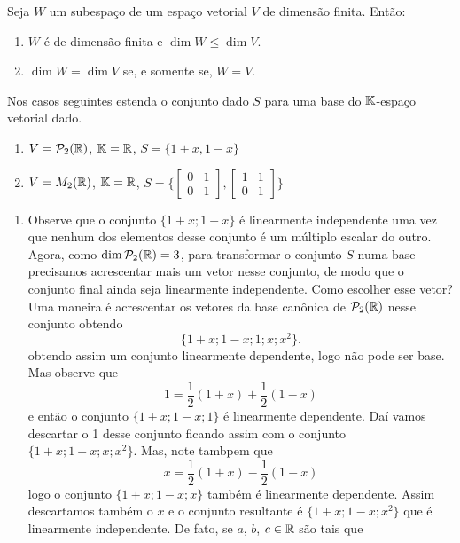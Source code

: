 \begin{exemplos}
\begin{teorema}
  Seja $W$ um subespaço de um espaço vetorial $V$ de dimensão finita. Então: 
  \begin{enumerate}[label={\roman*})]
    \item $W$ é de dimensão finita e $\dim W \le \dim V$. 
        
    \item $\dim W = \dim V$ se, e somente se, $W = V$.
  \end{enumerate}
\end{teorema}

\begin{exemplos}
  Nos casos seguintes estenda o conjunto dado $S$ para uma base do $\mathbb{K}$-espaço vetorial dado.
  \begin{enumerate}
    \item $V = \mathcal{P}_2(\mathbb{R})$, $\mathbb{K} = \mathbb{R}$, $S = \{1 + x, 1 - x\}$
    \item $V = M_2(\mathbb{R})$, $\mathbb{K} = \mathbb{R}$, $S = \{\begin{bmatrix}0 & 1\\0 & 1\end{bmatrix}, \begin{bmatrix}1 & 1\\0 & 1\end{bmatrix}\}$
  \end{enumerate}
  \begin{solucao}
    \begin{enumerate}
      \item Observe que o conjunto $\{1 + x; 1 - x\}$ é linearmente independente uma vez que nenhum dos elementos desse conjunto é um múltiplo escalar do outro. Agora, como $\dim\mathcal{P}_2(\mathbb{R}) = 3$, para transformar o conjunto $S$ numa base precisamos acrescentar mais um vetor nesse conjunto, de modo que o conjunto final ainda seja linearmente independente. Como escolher esse vetor?
        Uma maneira é acrescentar os vetores da base canônica de $\mathcal{P}_2(\mathbb{R})$ nesse conjunto obtendo
        \[
          \{1 + x; 1 - x; 1; x; x^2\}.
        \]
        obtendo assim um conjunto linearmente dependente, logo não pode ser base. Mas observe que
        \[
          1 = \dfrac{1}{2}(1 + x) + \dfrac{1}{2}(1 - x)
        \]
        e então o conjunto $\{1 + x; 1 - x; 1\}$ é linearmente dependente. Daí vamos descartar o 1 desse conjunto ficando assim com o conjunto $\{1 + x; 1 - x; x; x^2\}$. Mas, note tambpem que
        \[
          x = \dfrac{1}{2}(1 + x) - \dfrac{1}{2}(1 - x)
        \]
        logo o conjunto $\{1 + x; 1 - x; x\}$ também é linearmente dependente. Assim descartamos também o $x$ e o conjunto resultante é $\{1 + x; 1 - x; x^2\}$ que é linearmente independente. De fato, se $a$, $b$, $c \in \mathbb{R}$ são tais que

\end{enumerate}
\end{solucao}
\end{exemplos}
\end{exemplos}
